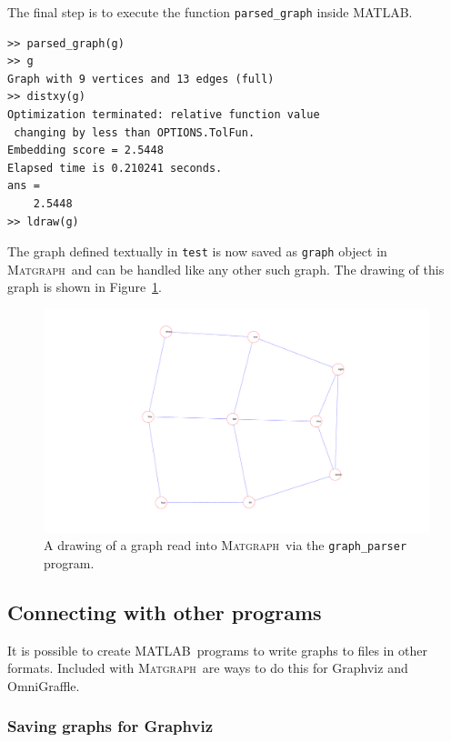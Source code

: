\documentclass[12pt]{amsart}
\newcommand\matlab{MATLAB}
\newcommand\matgraph{\textsc{Matgraph}}
\begin{document}
The final step is to execute the function \verb|parsed_graph| inside
\matlab.
\begin{verbatim}
>> parsed_graph(g)
>> g
Graph with 9 vertices and 13 edges (full)
>> distxy(g)
Optimization terminated: relative function value
 changing by less than OPTIONS.TolFun.
Embedding score = 2.5448
Elapsed time is 0.210241 seconds.
ans =
    2.5448
>> ldraw(g)
\end{verbatim}
The graph defined textually in \verb|test| is now saved as
\verb|graph| object in \matgraph\ and can be handled like any other
such graph. The drawing of this graph is shown in
Figure~\ref{fig:parsed}.
\begin{figure}[ht]
  \begin{center}
    \includegraphics[width=\textwidth]{figs/parsed}
  \end{center}
  \caption{A drawing of a graph read into \matgraph\ via the
    \texttt{graph\_parser} program.}
  \label{fig:parsed}
\end{figure}


\subsection {Connecting with other programs}

It is possible to create \matlab\ programs to write graphs to files in
other formats. Included with \matgraph\ are ways to do this for
Graphviz and OmniGraffle.

\subsubsection*{Saving graphs for Graphviz}
\end{document}
